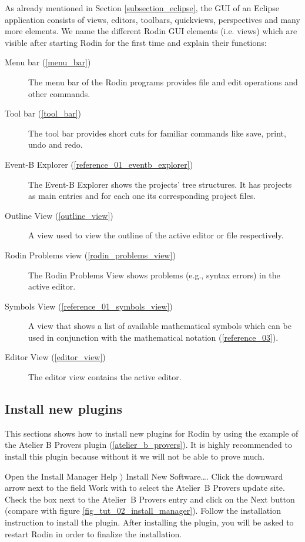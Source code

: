 As already mentioned in Section \ref{subsection_eclipse}, the GUI of an Eclipse application consists of views, editors, toolbars, quickviews, perspectives and many more elements. We name the different Rodin GUI elements (i.e. views) which are visible after starting Rodin for the first time and explain their functions:

\begin{description}
	\item[Menu bar (\ref{menu_bar})] The menu bar of the Rodin programs provides file and edit operations and other commands.
	\item[Tool bar (\ref{tool_bar})] The tool bar provides short cuts for familiar commands like save, print, undo and redo.
	\item[Event-B Explorer (\ref{reference_01_eventb_explorer})] The Event-B Explorer shows the projects' tree structures. It has projects as main entries and for each one its corresponding project files.
	\item[Outline View (\ref{outline_view})] A view used to view the outline of the active editor or file respectively.
	\item[Rodin Problems view (\ref{rodin_problems_view})] The Rodin Problems View shows problems (e.g., syntax errors) in the active editor.
	\item[Symbols View (\ref{reference_01_symbols_view})] A view that shows a list of available mathematical symbols which can be used in conjunction with the mathematical notation (\ref{reference_03}).
	\item[Editor View (\ref{editor_view})] The editor view contains the active editor.
\end{description}

\subsection{Install new plugins}

This sections shows how to install new plugins for Rodin by using the example of the Atelier B Provers plugin (\ref{atelier_b_provers}). It is highly recommended to install this plugin because without it we will not be able to prove much.

Open the Install Manager \textsf{Help $\rangle$ Install New Software\ldots}. Click the downward arrow next to the field \textsf{Work with} to select the Atelier~B Provers update site. Check the box next to the Atelier~B Provers entry and click on the \textsf{Next} button (compare with figure \ref{fig_tut_02_install_manager}). Follow the installation instruction to install the plugin. After installing the plugin, you will be asked to restart Rodin in order to finalize the installation.

